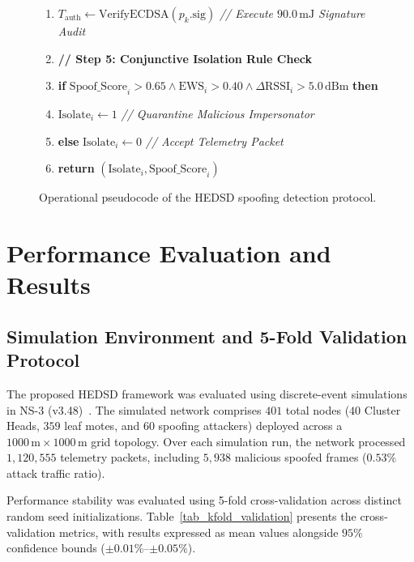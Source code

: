 \documentclass[conference]{IEEEtran}
\begin{document}
\begin{figure}[htbp]
{\begin{minipage}{0.96\columnwidth}
\begin{enumerate}
    \item \quad $T_{\text{auth}} \leftarrow \text{VerifyECDSA}(p_k.\text{sig})$ \quad \textit{// Execute $90.0\,\text{mJ}$ Signature Audit}
    \item \textbf{// Step 5: Conjunctive Isolation Rule Check}
    \item \textbf{if} $\text{Spoof\_Score}_i > 0.65 \land \text{EWS}_i > 0.40 \land \Delta\text{RSSI}_i > 5.0\,\text{dBm}$ \textbf{then}
    \item \quad $\text{Isolate}_i \leftarrow 1$ \quad \textit{// Quarantine Malicious Impersonator}
    \item \textbf{else} $\text{Isolate}_i \leftarrow 0$ \quad \textit{// Accept Telemetry Packet}
    \item \textbf{return} $(\text{Isolate}_i, \text{Spoof\_Score}_i)$
\end{enumerate}
\end{minipage}
}
\caption{Operational pseudocode of the HEDSD spoofing detection protocol.}
\label{fig_alg_iah_edsd}
\end{figure}

\section{Performance Evaluation and Results}
\label{sec_results}

\subsection{Simulation Environment and 5-Fold Validation Protocol}
The proposed HEDSD framework was evaluated using discrete-event simulations in NS-3 (v3.48)~\cite{ref_ns3_official_36, ref_netanim_37}. The simulated network comprises $401$ total nodes ($40$ Cluster Heads, $359$ leaf motes, and $60$ spoofing attackers) deployed across a $1000\,\text{m} \times 1000\,\text{m}$ grid topology. Over each simulation run, the network processed $1,120,555$ telemetry packets, including $5,938$ malicious spoofed frames ($0.53\%$ attack traffic ratio).

Performance stability was evaluated using 5-fold cross-validation across distinct random seed initializations. Table~\ref{tab_kfold_validation} presents the cross-validation metrics, with results expressed as mean values alongside $95\%$ confidence bounds ($\pm 0.01\%$--$\pm 0.05\%$).
\end{document}
